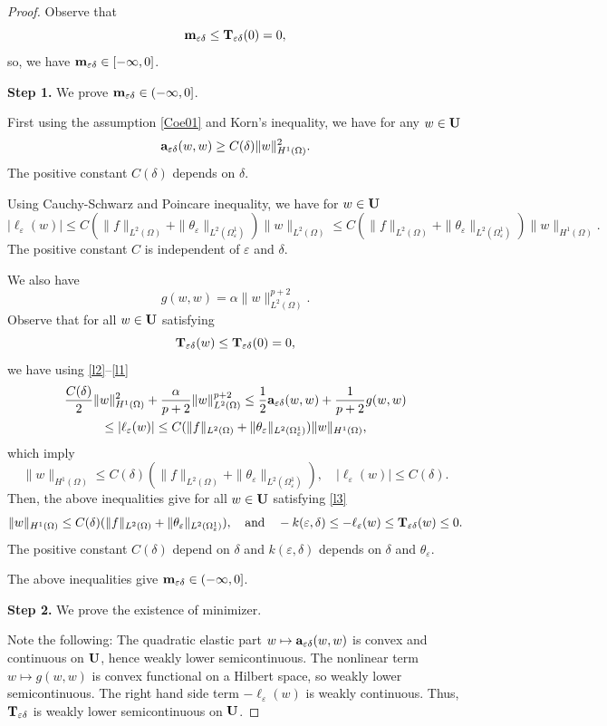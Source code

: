 \documentclass[11pt,a4paper]{article}
\numberwithin{equation}{section}
\def\O{\Omega}
\def\d{\delta}
\def\e{\varepsilon}
\def\a{{\alpha}}
\def\Ga{{\bf a}}
\def\ed{{\varepsilon\delta}}
\def\Ga{{\bf a}}
\def\Gm{{\bf m}}
\def\GT{{\bf T}}
\def\GU{{\bf U}}
\begin{document}
\begin{proof}
	Observe that
	$$\Gm_\ed\leq \GT_\ed(0)=0,$$
	so, we have $\Gm_\ed\in [-\infty,0]$. 
	
	{\bf Step 1.} We prove $\Gm_\ed\in(-\infty,0]$.
	
	First using the assumption \eqref{Coe01} and Korn's inequality, we have for any $w\in\GU$
	\begin{equation}\label{l2}
		\Ga_\ed(w,w)\geq C(\d)\|w\|^2_{H^1(\O)}.
	\end{equation}
	The positive constant  $C(\d)$  depends on $\d$. 
		
	Using Cauchy-Schwarz and Poincare inequality, we have for $w\in \GU$
	\begin{equation}\label{l1}
		|\ell_\e(w)|\leq C(\|f\|_{L^2(\O)}+\|\theta_\e\|_{L^2(\O^1_\e)})\|w\|_{L^2(\O)}\leq C(\|f\|_{L^2(\O)}+\|\theta_\e\|_{L^2(\O^1_\e)})\|w\|_{H^1(\O)}.
	\end{equation}
	The positive constant $C$ is independent of $\e$ and $\d$.
	
	We also have
	$$g(w,w)=\alpha\|w\|^{p+2}_{L^2(\O)}.$$
	Observe that for all $w\in\GU$ satisfying
	\begin{equation}\label{l3}
		\GT_\ed(w)\leq \GT_\ed(0)=0,
	\end{equation}
	we have using \eqref{l2}--\eqref{l1}
	\begin{multline}\label{AP01}
		{C(\d)\over 2}\|w\|^2_{H^1(\O)}+{\a\over p+2}\|w\|^{p+2}_{L^2(\O)}\leq {1\over 2}\Ga_\ed(w,w)+{1\over p+2}g(w,w)\\
		\leq |\ell_\e(w)|\leq C(\|f\|_{L^2(\O)}+\|\theta_\e\|_{L^2(\O^1_\e)})\|w\|_{H^1(\O)},
	\end{multline}
	which imply
	$$\|w\|_{H^1(\O)}\leq C(\d)(\|f\|_{L^2(\O)}+\|\theta_\e\|_{L^2(\O^1_ \e)}),\quad |\ell_\e(w)|\leq C(\d).$$
	Then, the above inequalities give for all $w\in\GU$ satisfying \eqref{l3}
	\begin{equation}\label{l4}
		\|w\|_{H^1(\O)}\leq C(\d)(\|f\|_{L^2(\O)}+\|\theta_\e\|_{L^2(\O^1_\e)}),\quad	\text{and}\quad
		-k(\e,\d)\leq -\ell_\e(w)\leq \GT_\ed(w)\leq 0.
	\end{equation}
	The positive constant $C(\d)$ depend on $\d$ and $k(\e,\d)$ depends on $\d$ and $\theta_\e$.

	The above inequalities give $\Gm_\ed\in(-\infty,0]$.
	
	{\bf Step 2.} We prove the existence of minimizer.
	
	Note the following: The quadratic elastic part $w\mapsto\Ga_\ed(w,w)$ is convex and continuous on $\GU$, hence weakly lower semicontinuous. The nonlinear term $w\mapsto g(w,w)$ is convex functional on a Hilbert space, so weakly lower semicontinuous. The right hand side term $-\ell_\e(w)$ is weakly continuous. Thus, $\GT_\ed$ is weakly lower semicontinuous on $\GU$. 
	

\end{proof}
\end{document}
